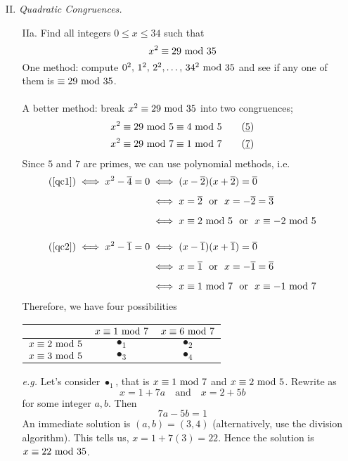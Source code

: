 \begin{itemize}[leftmargin=2em, itemsep=1.5em]
\item[II.] \emph{Quadratic Congruences.}
\begin{itemize}[leftmargin=*,itemsep=1.5em]
\item[IIa.] Find all integers $0 \leq x \leq 34$ such that
\[x^2 \equiv 29\text{ mod }{35}\]
One method: compute $0^2,\,1^2,\,2^2,\ldots,\,34^2\text{ mod }{35}$ and see if any one of them is $\equiv 29\text{ mod }{35}$.\\
\\
A better method: break $x^2 \equiv 29\text{ mod }{35}$ into two congruences;
\begin{align*}[left=\empheqlbrace]
x^2 \equiv 29\modar{5} &\equiv 4\modar{5}\label{qc1}\tag{$\underline{5}$}\\[0.1em]
x^2 \equiv 29\modar{7} &\equiv 1\modar{7}\label{qc2}\tag{$\underline{7}$}
\end{align*}
Since $5$ and $7$ are primes, we can use polynomial methods, i.e.
\begin{align*}
\refp{qc1} \iff x^2 - \overline{4} = 0 &\iff (x-\overline{2})(x+\overline{2}) = \overline{0}\\[0.5em]
&\iff x = \overline{2}\ \text{ or }\ x = -\overline{2} = \overline{3}\\[0.5em]
&\iff x \equiv 2\modar{5}\ \text{ or }\ x \equiv -2\modar{5}\\[1em]
\refp{qc2} \iff x^2 - \overline{1} = 0 &\iff (x-\overline{1})(x+\overline{1}) = \overline{0}\\[0.5em]
&\iff x = \overline{1}\ \text{ or }\ x = -\overline{1} = \overline{6}\\[0.5em]
&\iff x \equiv 1\modar{7}\ \text{ or }\ x \equiv -1\modar{7}
\end{align*}
Therefore, we have four possibilities
\begin{center}
\begin{tabular}{|c|c|c|}
\hline
&$x\equiv 1\text{ mod }{7}$&$x\equiv 6\text{ mod }{7}$\\
\hline
$x\equiv 2\text{ mod }{5}$ & $\bullet_1$& $\bullet_2$\\
\hline
$x\equiv 3\text{ mod }{5}$ & $\bullet_3$ & $\bullet_4$\\
\hline
\end{tabular}
\end{center}
\vspace*{0.2em}
\emph{e.g.} Let's consider $\bullet_1$, that is $x\equiv 1\text{ mod }{7}$ and $x\equiv 2\text{ mod }{5}$. Rewrite as
\[x = 1 + 7a \quad \text{and} \quad x = 2 + 5b\]
for some integer $a,b$. Then
\[7a - 5b = 1\]
An immediate solution is $(a,b) = (3,4)$ (alternatively, use the division algorithm). This tells us, $x = 1 + 7(3) = 22$. Hence the solution is $x \equiv 22\text{ mod }{35}$.\\

\end{itemize}
\end{itemize}
